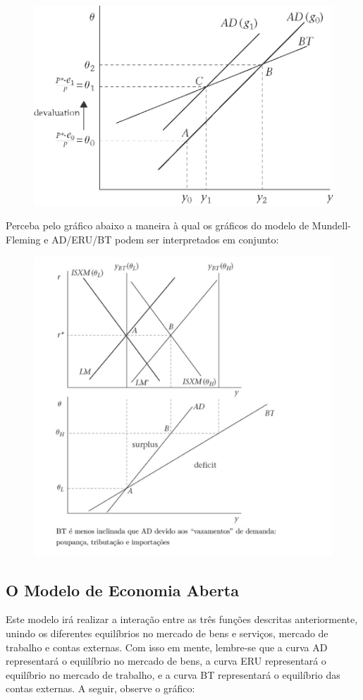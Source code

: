 \documentclass[a4paper,12pt]{article}[abntex2]
\begin{document}
\begin{figure}[H]
    \centering
    \includegraphics[width=0.7\linewidth]{Imagens/a26i8.png}
\end{figure}

Perceba pelo gráfico abaixo a maneira à qual os gráficos do modelo de Mundell-Fleming e AD/ERU/BT podem ser interpretados em conjunto: 

\begin{figure}[H]
    \centering
    \includegraphics[width=0.7\linewidth]{Imagens/a26i7.png}
\end{figure}

\subsection{\textbf{O Modelo de Economia Aberta}}
Este modelo irá realizar a interação entre as três funções descritas anteriormente, unindo os diferentes equilíbrios no mercado de bens e serviços, mercado de trabalho e contas externas. Com isso em mente, lembre-se que a curva AD representará o equilíbrio no mercado de bens, a curva ERU representará o equilíbrio no mercado de trabalho, e a curva BT representará o equilíbrio das contas externas. A seguir, observe o gráfico: 
\end{document}
